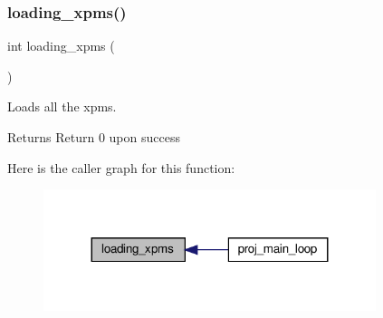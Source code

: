 \subsubsection{\texorpdfstring{loading\+\_\+xpms()}{loading\_xpms()}}
{\footnotesize\ttfamily int loading\+\_\+xpms (\begin{DoxyParamCaption}{ }\end{DoxyParamCaption})}



Loads all the xpms. 

\begin{DoxyReturn}{Returns}
Return 0 upon success 
\end{DoxyReturn}
Here is the caller graph for this function\+:\nopagebreak
\begin{figure}[H]
\begin{center}
\leavevmode
\includegraphics[width=275pt]{group__loading__xpms_ga462cc2177dd9b043e5bd5689bbeaf868_icgraph}
\end{center}
\end{figure}
